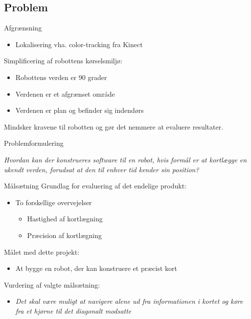 \subsection{Problem}
\begin{frame}[fragile]{Afgrænsning}
	\begin{itemize}
		\item Lokalisering vha. color-tracking fra Kinect
	\end{itemize}
	
	\linespace
	\pause
	
	Simplificering af robottens kørselsmiljø:
	\begin{itemize}
		\item Robottens verden er 90 grader
		\item Verdenen er et afgrænset område
		\item Verdenen er plan og befinder sig indendørs
	\end{itemize}
	\linespace
	Mindsker kravene til robotten og gør det nemmere at evaluere resultater.
\end{frame}

\begin{frame}[fragile]{Problemformulering}
	\begin{center}
		\textit{Hvordan kan der konstrueres software til en robot, hvis formål er at kortlægge en ukendt verden, forudsat at den til enhver tid kender sin position?}
	\end{center}
\end{frame}

\begin{frame}[fragile]{Målsætning}
	Grundlag for evaluering af det endelige produkt:
	\begin{itemize}
	\item To forskellige overvejelser
		\begin{itemize}
			\item Hastighed af kortlægning
			\item Præcision af kortlægning
		\end{itemize}
	\end{itemize}
	\linespace
	\pause
	
	Målet med dette projekt:
	\begin{itemize}
		\item At bygge en robot, der kan konstruere et præcist kort
	\end{itemize}
	\linespace
	\pause
	
	Vurdering af valgte målsætning:
	\begin{itemize}
		\item \textit{Det skal være muligt at navigere alene ud fra informationen i kortet og køre fra et hjørne til det diagonalt modsatte}
	\end{itemize}
\end{frame}

